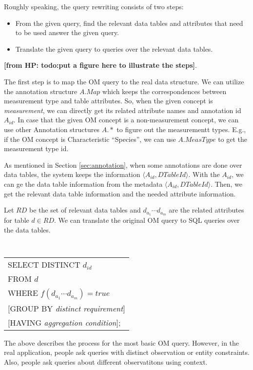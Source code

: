 \documentclass[conference]{IEEEtran}
\newcommand{\from}[2]{{\bf[{\sc from #1:} #2]}}
\begin{document}
Roughly speaking, the query rewriting consists of two steps:
\begin{itemize}
\item From the given query, find the relevant data tables and
  attributes that need to be used answer the given query. 
\item Translate the given query to queries over the relevant data
  tables. 
\end{itemize}

\from{HP}{todo:put a figure here to illustrate the steps}. 

The first step is to map the OM query to the real data structure. 
We can utilize the annotation structure $A.Map$ which keeps the correspondences between
measurement type and table attributes. 
So, when the given concept is {\em measurement}, we can directly get
its related attribute names and annotation id $A_{id}$. 
In case that the given OM concept is a non-measurement concept, we can use
other Annotation structures $A.*$ to figure out the measurementt types. 
E.g., if the OM concept is Characteristic ``Species'', we can use
$A.MeasType$ to get the measurement type id. 

As mentioned in Section \ref{sec:annotation}, when some annotations are done over data tables, the system keeps the
information $\langle A_{id}, DTableId\rangle$. 
With the $A_{id}$, we can ge the data table information from the
metadata  $\langle A_{id}, DTableId\rangle$. 
Then, we get the relevant data table information and the needed attribute
information.

Let $RD$ be the set of relevant data tables and $d_{a_1} \cdots d_{a_m}$
are the related attributes for table $d\in RD$. We can translate the original OM query to SQL queries
over the data tables.  


\vspace{0.1in}
{\tt 
\begin{tabular}{l} 
SELECT DISTINCT $d_{id}$\\
FROM $d$\\
WHERE $f(d_{a_1} \cdots d_{a_m}) = true$\\
$[$GROUP BY {\em distinct requirement}$]$\\
$[$HAVING {\em aggregation condition}$]$;
\end{tabular}
}
\vspace{0.1in}

The above describes the process for the most basic OM query. 
However, in the real application, people ask queries with distinct
observation or entity constraints. Also, people ask queries about
different observatitons using context. 
\end{document}
